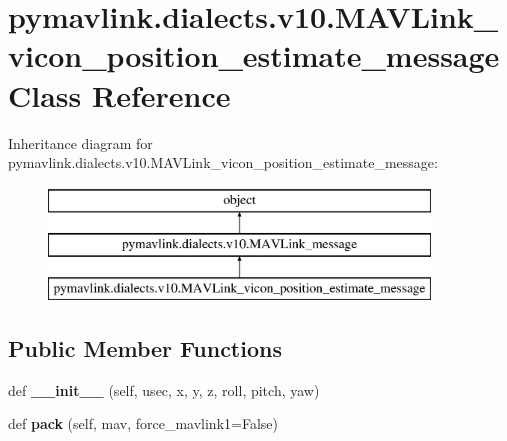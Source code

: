\hypertarget{classpymavlink_1_1dialects_1_1v10_1_1MAVLink__vicon__position__estimate__message}{}\section{pymavlink.\+dialects.\+v10.\+M\+A\+V\+Link\+\_\+vicon\+\_\+position\+\_\+estimate\+\_\+message Class Reference}
\label{classpymavlink_1_1dialects_1_1v10_1_1MAVLink__vicon__position__estimate__message}
Inheritance diagram for pymavlink.\+dialects.\+v10.\+M\+A\+V\+Link\+\_\+vicon\+\_\+position\+\_\+estimate\+\_\+message\+:\begin{figure}[H]
\begin{center}
\leavevmode
\includegraphics[height=3.000000cm]{classpymavlink_1_1dialects_1_1v10_1_1MAVLink__vicon__position__estimate__message}
\end{center}
\end{figure}
\subsection*{Public Member Functions}
\begin{DoxyCompactItemize}
\item 
\mbox{\label{classpymavlink_1_1dialects_1_1v10_1_1MAVLink__vicon__position__estimate__message_a535ba12e4d4f8ed61acb2cc7dbd7515e}} 
def {\bfseries \+\_\+\+\_\+init\+\_\+\+\_\+} (self, usec, x, y, z, roll, pitch, yaw)
\item 
\mbox{\label{classpymavlink_1_1dialects_1_1v10_1_1MAVLink__vicon__position__estimate__message_ac15bf3efa5ad134a9f181db0ef1f65a6}} 
def {\bfseries pack} (self, mav, force\+\_\+mavlink1=False)
\end{DoxyCompactItemize}
